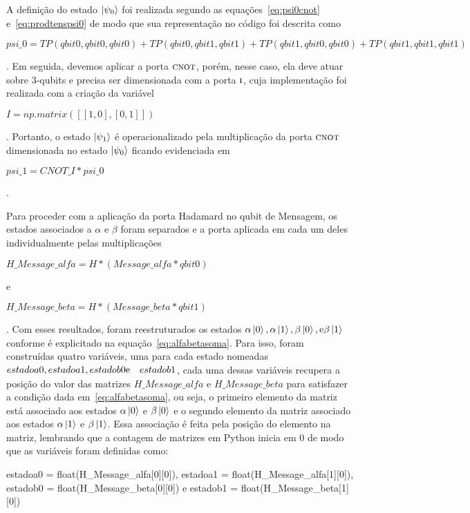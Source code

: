 A definição do estado $\ket{\psi_0}$ foi realizada segundo as equações~\eqref{eq:psi0cnot} e~\eqref{eq:prodtenspsi0} de modo que sua representação no código foi descrita como \begin{tiny}\textbf{$psi\_0 = TP(qbit0, qbit0, qbit0) + TP(qbit0, qbit1, qbit1) + TP(qbit1,qbit0, qbit0) + TP(qbit1,qbit1,qbit1)$}\end{tiny}. Em seguida, devemos aplicar a porta \(\operatorname{\textsc{cnot}}\), porém, nesse caso, ela deve atuar sobre 3-qubits e precisa ser dimensionada com a porta \(\operatorname{\textsc{i}}\), cuja implementação foi realizada com a criação da variável \begin{tiny}\textbf{$I = np.matrix ([[1,0], [0,1]])$}\end{tiny}. Portanto, o estado $\ket{\psi_1}$ é operacionalizado pela multiplicação da porta \(\operatorname{\textsc{cnot}}\) dimensionada no estado $\ket{\psi_0}$ ficando evidenciada em \begin{tiny}\textbf{$psi\_1 = CNOT\_I * psi\_0$}\end{tiny}.

Para proceder com a aplicação da porta Hadamard no qubit de Mensagem, os estados associados a $\alpha$ e $\beta$ foram separados e a porta aplicada em cada um deles individualmente pelas multiplicações \begin{tiny}\textbf{$H\_Message\_alfa = H * (Message\_alfa * qbit0)$}\end{tiny} e \begin{tiny}\textbf{$H\_Message\_beta = H * (Message\_beta * qbit1)$}\end{tiny}. Com esses resultados, foram reestruturados os estados $\alpha\ket{0}, \alpha\ket{1}, \beta\ket{0}, \text e \beta\ket{1}$ conforme é explicitado na equação~\eqref{eq:alfabetasoma}. Para isso, foram construídas quatro variáveis, uma para cada estado nomeadas \textit{$estadoa0, estadoa1, estadob0 \text e \quad estadob1$}, cada uma dessas variáveis recupera a posição do valor das matrizes \textit{$H\_Message\_alfa$} e \textit{$H\_Message\_beta$} para satisfazer a condição dada em~\eqref{eq:alfabetasoma}, ou seja, o primeiro elemento da matriz está associado aos estados $\alpha\ket{0}$ e $\beta\ket{0}$ e o segundo elemento da matriz associado aos estados $\alpha\ket{1}$ e $\beta\ket{1}$. Essa associação é feita pela posição do elemento na matriz, lembrando que a contagem de matrizes em Python inicia em 0 de modo que as variáveis foram definidas como:

\begin{center}
\begin{tiny}estadoa0 = float(H\_Message\_alfa[0][0]), estadoa1 = float(H\_Message\_alfa[1][0]),\linebreak
estadob0 = float(H\_Message\_beta[0][0]) e  estadob1 = float(H\_Message\_beta[1][0])\end{tiny}
\end{center}

